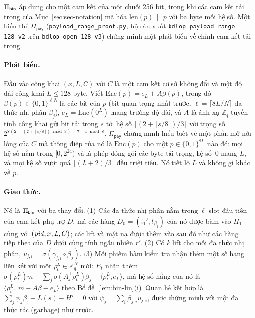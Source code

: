 $\Pi_{\mathsf{bin}}$ áp dụng cho một cam kết của một chuỗi 256 bit, trong khi các cam kết
tải trọng của Mục~\ref{sec:sec-notation} mã hóa $\mathrm{len}(p)\,\|\,p$
với ba byte mỗi hệ số. Một biến thể $\Pi_{\mathsf{pay}}$
(\texttt{payload\_range\_proof.py}, bộ sản xuất
\texttt{bdlop-payload-range-128-v2} trên \texttt{bdlop-open-128-v3})
chứng minh một phát biểu về chính cam kết tải trọng.

\paragraph{Phát biểu.} Đầu vào công khai $(x,L,C)$ với $C$ là một cam kết cơ sở
không đổi và một độ dài công khai $L\le128$ byte. Viết
$\mathrm{Enc}(p)=e_L+A\beta(p)$, trong đó $\beta(p)\in\{0,1\}^{\ell N}$ là các
bit của $p$ (bit quan trọng nhất trước, $\ell=\lceil8L/N\rceil$ đa thức nhị
phân $\beta_j$), $e_L=\mathrm{Enc}(0^L)$ mang trường độ dài, và
$A$ là ánh xạ $\mathbb Z_q$-tuyến tính công khai gửi bit tải trọng $s$ tới
hệ số $\lfloor(2+\lfloor s/8\rfloor)/3\rfloor$ với trọng số
$2^{8(2-(2+\lfloor s/8\rfloor)\bmod3)+7-s\bmod8}$. $\Pi_{\mathsf{pay}}$ chứng
minh hiểu biết về một phần mở nới lỏng của $C$ mà thông điệp của nó là
$\mathrm{Enc}(p)$ cho một $p\in\{0,1\}^{8L}$ nào đó: mọi hệ số nằm trong
$[0,2^{24})$ và là phép đóng gói các byte tải trọng, hệ số~$0$ mang $L$, và mọi
hệ số vượt quá $\lceil(L+2)/3\rceil$ đều triệt tiêu. Nó tiết lộ $L$ và không gì
khác về $p$.

\paragraph{Giao thức.} Nó là $\Pi_{\mathsf{bin}}$ với ba thay đổi. (1) Các đa thức nhị
phân nằm trong $\ell$ slot đầu tiên của cam kết phụ trợ $D$, mà các hàng
$D_0=(t_1',t_{\beta_j})$ của nó được băm vào $H_1$ cùng với
$(\mathit{pid},x,L,C)$; các lift và mặt nạ được thêm vào sau đó như các hàng tiếp theo
của $D$ dưới cùng tính ngẫu nhiên $r'$. (2) Có $k$ lift cho mỗi đa thức nhị
phân, $u_{j,i}=\sigma(\gamma_{j,i}\circ\beta_j)$. (3) Mỗi phiếm hàm kiểm tra
nhận thêm một số hạng liên kết với một $\rho^L_t\in\mathbb Z_q^N$ mới:
$E_t$ nhận thêm $\sigma(\rho^L_t)m-\sum_j\sigma(A_j^{\mathsf T}\rho^L_t)\beta_j
-\langle\rho^L_t,e_L\rangle$, mà hệ số hằng của nó là
$\langle\rho^L_t,\,m-A\beta-e_L\rangle$ theo Bổ đề~\ref{lem:bin-lin}(i). Quan
hệ kết hợp là $\sum_j\psi_j\beta_j+L(s)-H'=0$ với
$\psi_j=\sum_i\beta_{j,i}u_{j,i}$, được chứng minh với một đa thức rác (garbage)
như trước.

